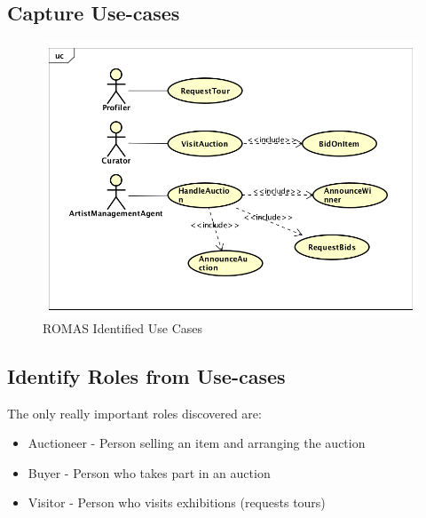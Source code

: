 \documentclass[a4paper, 11pt]{article}
\begin{document}
\subsection{Capture Use-cases}
\begin{figure}[H]
	\caption{ROMAS Identified Use Cases}
	\centering
	\includegraphics[width=\textwidth]{./images/ROMASusecases.png}
\end{figure}

\subsection{Identify Roles from Use-cases}
The only really important roles discovered are:
\begin{itemize}
\item Auctioneer - Person selling an item and arranging the auction
\item Buyer - Person who takes part in an auction
\item Visitor - Person who visits exhibitions (requests tours)
\end{itemize}
\end{document}
